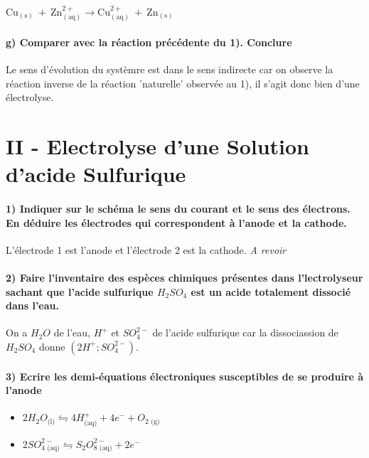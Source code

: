 \documentclass[a4paper, 12pt]{scrartcl}
\begin{document}
$\text{Cu}_{(\text{s})}\ +\ \text{Zn}^{2+}_{(\text{aq})} \longrightarrow \text{Cu}^{2+}_{(\text{aq})}\ +\ \text{Zn}_{(\text{s})}$

\paragraph*{g) Comparer avec la réaction précédente du 1). Conclure \\[5mm]}

Le sens d'évolution du systèmre est dans le sens indirecte car on observe la réaction inverse de la réaction 'naturelle' observée au 1), 
il s'agit donc bien d'une électrolyse.



\section*{II - Electrolyse d'une Solution d'acide Sulfurique}
\paragraph*{1) Indiquer sur le schéma le sens du courant et le sens des électrons. En déduire les électrodes qui correspondent à l'anode et la cathode. \\[5mm]}

L'électrode 1 est l'anode et l'électrode 2 est la cathode. \emph{A revoir}

\paragraph*{2) Faire l'inventaire des espèces chimiques présentes dans l'lectrolyseur sachant que l'acide sulfurique $H_2SO_4$ est un acide totalement dissocié dans l'eau. \\[5mm]}

On a $H_2O$ de l'eau, $H^+$ et $SO_4^{2-}$ de l'acide sulfurique car la dissociassion de $H_2SO_4$ donne $(2H^+; SO_4^{2-})$.

\paragraph*{3) Ecrire les demi-équations électroniques susceptibles de se produire à l'anode \\[5mm]}

\begin{itemize}
    \item[\textbullet] $2H_2O_{\text{(l)}} \leftrightharpoons 4H^+_{\text{(aq)}} + 4e^- + O_{2\text{ (g)}}$ \\[2mm]
    \item[\textbullet] $2SO_{4\text{ (aq)}}^{2-} \leftrightharpoons S_2O^{2-}_{8\text{ (aq)}}+2e^-$ \\[2mm]
\end{itemize}
\end{document}
